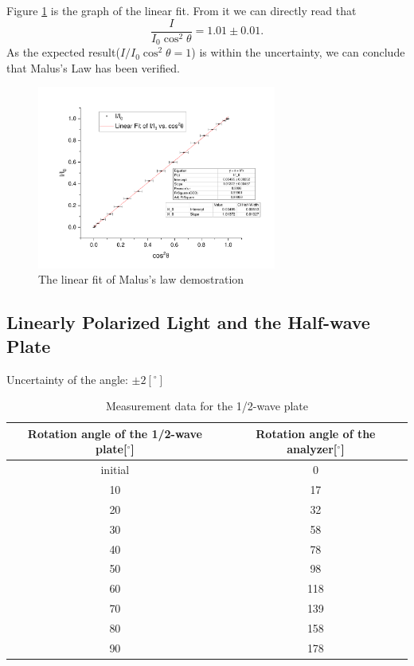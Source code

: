 \documentclass{my_template}
\begin{document}
    Figure \ref{fig: Malus's Law linear fit} is the graph of the linear fit. From it we can directly read that $$\frac{I}{I_0\cos^2\theta}=1.01\pm 0.01.$$ As the expected result($I/I_0\cos^2\theta=1$) is within the uncertainty, we can conclude that Malus's Law has been verified.
    \begin{figure}[!ht]
        \centering
        \includegraphics[width=0.7\textwidth]{fig/malus_law.pdf}
        \caption{The linear fit of Malus's law demostration}
        \label{fig: Malus's Law linear fit}
    \end{figure}
    \subsection{Linearly Polarized Light and the Half-wave Plate}
    \begin{table}[!ht]
        \centering
        Uncertainty of the angle: $\pm 2[^\circ]$
        \begin{tabular}{|c|c|}
            \hline
            Rotation angle of the 1/2-wave plate[$^\circ$]&Rotation angle of the analyzer[$^\circ$]\\\hline
            initial&0\\\hline
            10&17\\\hline
            20&32\\\hline
            30&58\\\hline
            40&78\\\hline
            50&98\\\hline
            60&118\\\hline
            70&139\\\hline
            80&158\\\hline
            90&178\\\hline
        \end{tabular}
        \caption{Measurement data for the 1/2-wave plate}
        \label{tab:half plate}
    \end{table}
\end{document}
